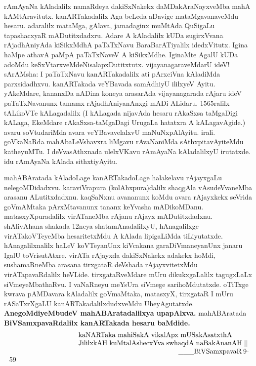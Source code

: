 \documentclass[11pt,a4size]{article}
\begin{document}
rAmAyaNa kAladalilx namaRdeya dakiSxNakekx daMDakAraNayxveMba mahA
kAMtAravitutx. kanARTakadalilx Aga beLeda aDavige mataMgavanaveMdu
hesaru. adaralilx mataMga, gAlava, jamadaginx muMtAda QuSigaLu
tapashacxyaR mADutitxdadxru. Adare A kAladalilx kUDa sugirxVvana
rAjadhAniyAda kiSikxMdhA paTaTxNavu BaraBarATiyalilx
idedxVitutx. Igina haMpe athavA paMpA paTaTxNaveV A
kiSikxMdhe. IginaMte AgalU kUDa adoMdu
keSxVtarxveMdeNisalapxDutitxtutx. vijayanagaraveMdarU ideV! sArAMsha:
I paTaTxNavu kanARTakadalilx ati pArxciVna kAladiMda
parxsidadhxvu. kanARTakada veYBavada samAdhiyU ililxyeV
Ayitu. yAkeMdare, kananxDa nADina koneya arasarAda vijayanagarada
rAjaru ideV paTaTxNavanunx tamamx rAjadhAniyanAnxgi mADi
ALidaru. 1565ralilx tALikoVTe kALagadalilx (I kALagada nijavAda hesaru
rAkaSxsa taMgaDigi kALaga, EkeMdare rAkaSxsa-taMgaDagi UrugaLa
hatatxra A kALagavAgide.) avaru soVtudariMda avara veYBavavelalxvU
maNuNxpAlAyitu. irali. goVkaNaRda mahAbaLeVshavxra liMgavu rAvaNaniMda
sAthxpitavAyiteMdu katheyuMTu. I deVvasAthxnada ulelxVKavu rAmAyaNa
kAladalilxyU irutatxde. idu rAmAyaNa kAlada sithxtiyAyitu.

mahABAratada kAladoLage kanARTakadoLage halakelavu rAjayxgaLu
nelegoMDidadxvu. karaviVrapura (kolAhxpura)dalilx shaqgAla
vAsudeVvaneMba arasanu ALutitxdadxnu. kaqSaNxnu avananunx koMdu avara
rAjayxkekx seVrida goVmAMtaka pArxMtavanunx tananx keYvasha
mADikoMDanu. matasxyXpuradalilx virATaneMba rAjanu rAjayx
mADutitxdadxnu. shAlivAhana shakada 12neya shatamAnadalilxyU,
hAnagalilxge virATakoVTeyeMba hesaritetxMdu A kAlada lipigaLiMda
tiLiyutatxde. hAnagalilxnalilx haLeV koVTeyanUnx kiVcakana
garaDiVmaneyanUnx janaru IgalU toVrisutAtxre. virATa rAjayxda
dakiSxNakekx adakekx hoMdi, sushamaRneMba arasana tirxgataR deVshada
rAjayxvitetxMdu virATapavaRdalilx heVLide. tirxgataRveMdare mUru
dikukxgaLalilx tagugxLaLx siVmeyeMbathaRvu. I vaNaRneyu meYsUra
siVmege sarihoMdutatxde. oTiTxge kwrava pAMDavara kAladalilx
goVmaMtaka, matasxyX, tirxgataR I mUru rASaTxrXgaLU
kanARTakadalilxdudxveMdu UheyAgutatxde. \textbf{AnegoMdiyeMbudeV
  mahABAratadalilxya upapAlxva.} mahABAratada
\textbf{BiVSamxpavaRdalilx kanARTakada hesaru baMdide.}
$$
\vbox{\parskip=0pt\parindent=0pt \everypar{\hskip10em} \obeylines
kaNARTaka mahiSakA vikalApx mUSakAsatxthA
JililxkAH kuMtalAshecxYva swhaqdA naBakAnanAH ||

\hspace{5cm} \_\_\_BiVSamxpavaR 9-59}
$$ 
\end{document}

